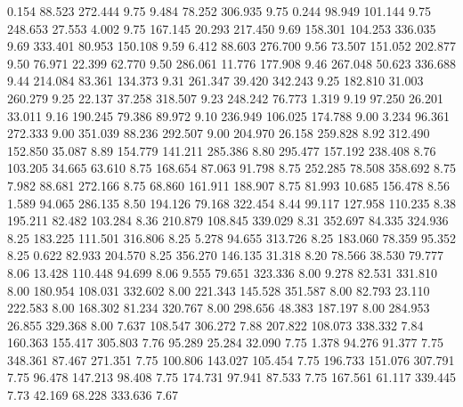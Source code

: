    0.154   88.523  272.444         9.75
   9.484   78.252  306.935         9.75
   0.244   98.949  101.144         9.75
 248.653   27.553    4.002         9.75
 167.145   20.293  217.450         9.69
 158.301  104.253  336.035         9.69
 333.401   80.953  150.108         9.59
   6.412   88.603  276.700         9.56
  73.507  151.052  202.877         9.50
  76.971   22.399   62.770         9.50
 286.061   11.776  177.908         9.46
 267.048   50.623  336.688         9.44
 214.084   83.361  134.373         9.31
 261.347   39.420  342.243         9.25
 182.810   31.003  260.279         9.25
  22.137   37.258  318.507         9.23
 248.242   76.773    1.319         9.19
  97.250   26.201   33.011         9.16
 190.245   79.386   89.972         9.10
 236.949  106.025  174.788         9.00
   3.234   96.361  272.333         9.00
 351.039   88.236  292.507         9.00
 204.970   26.158  259.828         8.92
 312.490  152.850   35.087         8.89
 154.779  141.211  285.386         8.80
 295.477  157.192  238.408         8.76
 103.205   34.665   63.610         8.75
 168.654   87.063   91.798         8.75
 252.285   78.508  358.692         8.75
   7.982   88.681  272.166         8.75
  68.860  161.911  188.907         8.75
  81.993   10.685  156.478         8.56
   1.589   94.065  286.135         8.50
 194.126   79.168  322.454         8.44
  99.117  127.958  110.235         8.38
 195.211   82.482  103.284         8.36
 210.879  108.845  339.029         8.31
 352.697   84.335  324.936         8.25
 183.225  111.501  316.806         8.25
   5.278   94.655  313.726         8.25
 183.060   78.359   95.352         8.25
   0.622   82.933  204.570         8.25
 356.270  146.135   31.318         8.20
  78.566   38.530   79.777         8.06
  13.428  110.448   94.699         8.06
   9.555   79.651  323.336         8.00
   9.278   82.531  331.810         8.00
 180.954  108.031  332.602         8.00
 221.343  145.528  351.587         8.00
  82.793   23.110  222.583         8.00
 168.302   81.234  320.767         8.00
 298.656   48.383  187.197         8.00
 284.953   26.855  329.368         8.00
   7.637  108.547  306.272         7.88
 207.822  108.073  338.332         7.84
 160.363  155.417  305.803         7.76
  95.289   25.284   32.090         7.75
   1.378   94.276   91.377         7.75
 348.361   87.467  271.351         7.75
 100.806  143.027  105.454         7.75
 196.733  151.076  307.791         7.75
  96.478  147.213   98.408         7.75
 174.731   97.941   87.533         7.75
 167.561   61.117  339.445         7.73
  42.169   68.228  333.636         7.67
